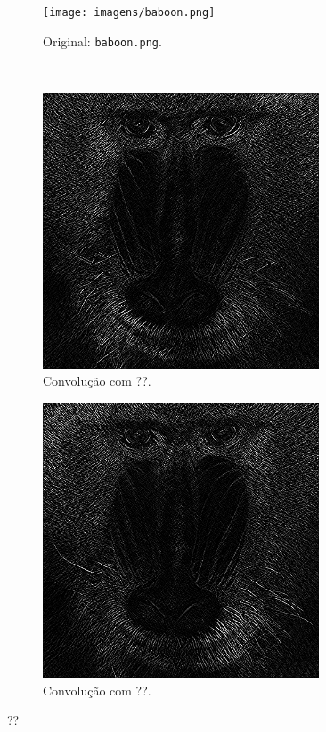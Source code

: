 \begin{figure}[H]
    \centering
    \begin{subfigure}{0.48\textwidth}
        \centering
        \texttt{[image: imagens/baboon.png]}
        \caption{Original: \texttt{baboon.png}.}
    \end{subfigure}\\[8pt]
    \begin{subfigure}{0.48\textwidth}
        \centering
        \includegraphics[width=0.9\textwidth]{resultados/baboon_h7.png}
        \caption{Convolução com ??.}
    \end{subfigure}%
    \begin{subfigure}{0.48\textwidth}
        \centering
        \includegraphics[width=0.9\textwidth]{resultados/baboon_h8.png}
        \caption{Convolução com ??.}
    \end{subfigure}

    \caption{??}
\end{figure}
